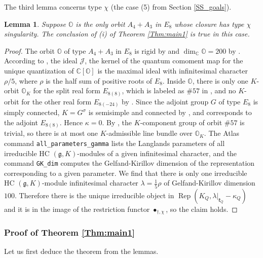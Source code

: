 \documentclass[12pt]{amsart}
\newcommand{\C}{\mathbb{C}}
\newcommand{\J}{\mathcal{J}}
\newcommand{\g}{\mathfrak{g}}
\newcommand{\Orb}{\mathbb{O}}
\newcommand{\kf}{\mathfrak{k}}
\newtheorem{Lem}[Thm]{Lemma}
\theoremstyle{definition}
\numberwithin{equation}{section}
\begin{document}
The third lemma concerns type $\chi$ (the case (5) from Section \ref{SS_goals}).

\begin{Lem}\label{Lem:type_chi}
Suppose $\Orb$ is the only orbit $A_4+A_3$ in $E_8$ whose closure has type $\chi$ singularity.
The conclusion of (i) of Theorem \ref{Thm:main1} is true in this case.
\end{Lem}

\begin{proof}
	The orbit $\Orb$ of type $A_4+A_3$ in $E_8$ is rigid by \cite[Table 3]{GraafElashvili}  and $\dim_\C \Orb=200$ by \cite[pg. 133]{CM}. 
According to \cite[Appendix D]{LMM}, the ideal $\J$, the kernel of the quantum comoment map for the unique quantization of $\C[\Orb]$
is the maximal ideal with infinitesimal character $\rho/5$, where $\rho$ is the half sum of positive roots of $E_8$. Inside $\Orb$, there is only one $K$-orbit $\Orb_K$ for the split real form $E_{8(8)}$, which is labeled as $\# 57$ in \cite[Table XIV]{Dk0}, and no $K$-orbit for the other real form $E_{8(-24)}$ by \cite[Table XV]{Dk0}. 
Since the adjoint group $G$ of type $E_8$ is simply connected, $K=G^\sigma$ is semisimple and connected by \cite[Table 3]{realgrp}, and corresponds to the adjoint $E_{8(8)}$. Hence $\kappa=0$. By \cite[Table 11, pg. 273]{King}, the $K$-component group of orbit $\# 57$ is trivial, so there is at most one $K$-admissible line bundle over $\Orb_K$.  The Atlas command  \verb|all_parameters_gamma| lists the Langlands parameters of all irreducible HC $(\g,K)$-modules of a given infinitesimal character, and the command \verb|GK_dim| computes the Gelfand-Kirillov dimension of the representation corresponding to a given parameter. We find that there is only one irreducible HC $(\g,K)$-module infinitesimal character $\lambda = \frac{1}{5} \rho$ of Gelfand-Kirillov dimension $100$. Therefore there is the unique irreducible object in $\operatorname{Rep}(K_Q,\lambda|_{\kf_Q}-\kappa_Q)$ and it is in the image of the restriction functor $\bullet_{\dagger,\chi}$, so the claim holds.
\end{proof}


\subsubsection{Proof of Theorem \ref{Thm:main1}} \label{SS:proof_main1}
Let us first deduce the theorem from the lemmas.
\end{document}
